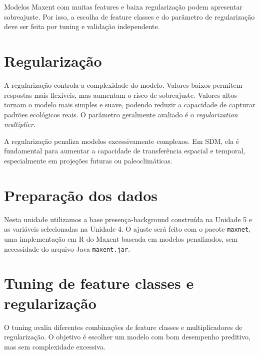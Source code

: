 \documentclass{ueap-sdm}
\begin{document}
\begin{atencao}[title={\faExclamationTriangle\quad Complexidade do Maxent}]
	Modelos Maxent com muitas features e baixa regularização podem apresentar sobreajuste. Por isso, a escolha de feature classes e do parâmetro de regularização deve ser feita por tuning e validação independente.
\end{atencao}

\section{Regularização}

A regularização controla a complexidade do modelo. Valores baixos permitem respostas mais flexíveis, mas aumentam o risco de sobreajuste. Valores altos tornam o modelo mais simples e suave, podendo reduzir a capacidade de capturar padrões ecológicos reais. O parâmetro geralmente avaliado é o \textit{regularization multiplier}.

\begin{conceito}[title={\faBook\quad Regularização}]
	A regularização penaliza modelos excessivamente complexos. Em SDM, ela é fundamental para aumentar a capacidade de transferência espacial e temporal, especialmente em projeções futuras ou paleoclimáticas.
\end{conceito}

\section{Preparação dos dados}

Nesta unidade utilizamos a base presença-background construída na Unidade 5 e as variáveis selecionadas na Unidade 4. O ajuste será feito com o pacote \texttt{maxnet}, uma implementação em R do Maxent baseada em modelos penalizados, sem necessidade do arquivo Java \texttt{maxent.jar}.



\section{Tuning de feature classes e regularização}

O tuning avalia diferentes combinações de feature classes e multiplicadores de regularização. O objetivo é escolher um modelo com bom desempenho preditivo, mas sem complexidade excessiva.
\end{document}
